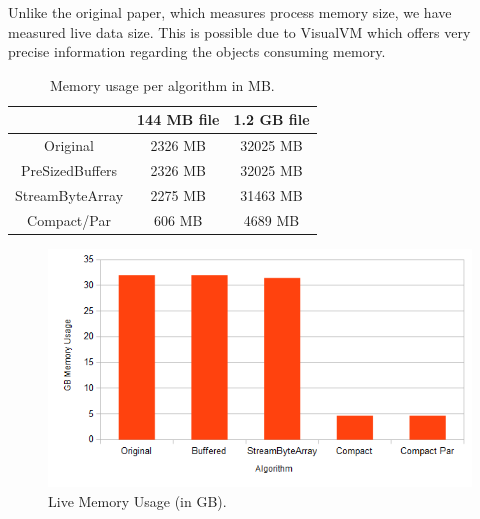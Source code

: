 \documentclass[a4paper,twoside]{article}
\begin{document}
Unlike the original paper, which measures process memory size, we have measured live data size.
This is possible due to VisualVM which offers very precise information regarding the objects consuming memory.



\begin{table}[h]
	\caption{Memory usage per algorithm in MB.}\centering
	\begin{tabular}{|c|c|c|}
		\hline			  	& 144 MB file		& 1.2 GB file		\\ \hline
		Original			& 2326 MB			& 32025 MB			\\ \hline
		PreSizedBuffers		& 2326 MB			& 32025 MB			\\ \hline
		StreamByteArray 	& 2275 MB			& 31463 MB			\\ \hline
		Compact/Par			& 606 MB			& 4689 MB			\\ \hline
	\end{tabular}
\end{table}

\begin{figure}[!h]
	\centering
	\includegraphics[scale=0.45]{images/memory_usage_1_2G.png}
	\caption{Live Memory Usage (in GB).}
\end{figure}
\end{document}
